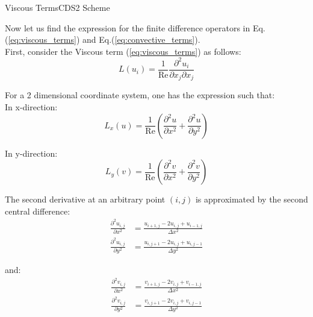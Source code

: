 \documentclass{beamer}
\newcommand{\ren}{ \text{Re} }
\begin{document}
\begin{frame}{Viscous Terms}{CDS2 Scheme}
	
	Now let us find the expression for the finite difference operators in Eq.(\ref{eq:viscous_terms}) and Eq.(\ref{eq:convective_terms}). \\
	
	First, consider the Viscous term (\ref{eq:viscous_terms}) as follows: \begin{equation}
		L (u_i) = \frac{1}{\ren} \frac{\partial^2 u_i}{\partial x_j \partial x_j}
	\end{equation}
	
	For a 2 dimensional coordinate system, one has the expression such that:
	\\
	In x-direction: \begin{equation}
		L_x (u) = \frac{1}{\ren} \left( \frac{\partial^2 u}{\partial x^2} + \frac{\partial^2 u}{\partial y^2} \right)
	\end{equation}
	
	In y-direction: \begin{equation}
		L_y (v) = \frac{1}{\ren} \left( \frac{\partial^2 v}{\partial x^2} + \frac{\partial^2 v}{\partial y^2} \right)
	\end{equation}
	
	\framebreak
	
	The second derivative at an arbitrary point $(i, j)$ is approximated by the second central difference: \begin{align}
		\frac{\partial^2 u_{i,j}}{\partial x^2} &= \frac{u_{i+1,j} - 2 u_{i,j} + u_{i-1,j}}{\Delta x^2} \\
		\frac{\partial^2 u_{i,j}}{\partial y^2} &= \frac{u_{i,j+1} - 2 u_{i,j} + u_{i,j-1}}{\Delta y^2}
	\end{align}
	
	and: \begin{align}
		\frac{\partial^2 v_{i,j}}{\partial x^2} &= \frac{v_{i+1,j} - 2 v_{i,j} + v_{i-1,j}}{\Delta x^2} \\
		\frac{\partial^2 v_{i,j}}{\partial y^2} &= \frac{v_{i,j+1} - 2 v_{i,j} + v_{i,j-1}}{\Delta y^2}
	\end{align}
	
\end{frame}
\end{document}
